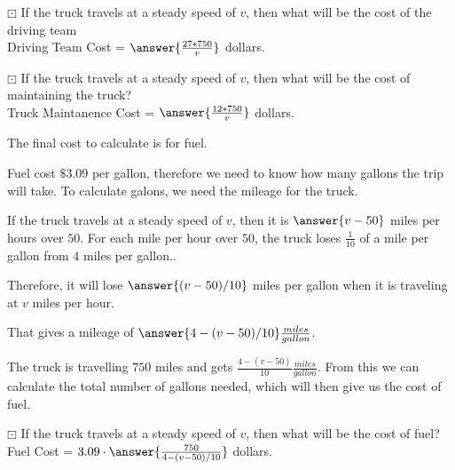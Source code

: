 \documentclass{ximera}
\begin{document}
\begin{question} $\boxdot$
If the truck travels at a steady speed of $v$, then what will be the cost of the driving team \\

Driving Team Cost = $\answer{\frac{27*750}{v}}$ dollars.
\end{question}




\begin{question} $\boxdot$
If the truck travels at a steady speed of $v$, then what will be the cost of maintaining the truck? \\

Truck Maintanence Cost = $\answer{\frac{12*750}{v}}$ dollars.
\end{question}



The final cost to calculate is for fuel.

Fuel cost $\$3.09$ per gallon, therefore we need to know how many gallons the trip will take. To calculate galons, we need the mileage for the truck.


\begin{explanation}

If the truck travels at a steady speed of $v$, then it is $\answer{v-50}$ miles per hours over $50$. For each mile per hour over $50$, the truck loses $\frac{1}{10}$ of a mile per gallon from $4$ miles per gallon..

Therefore, it will lose $\answer{(v-50)/10}$ miles per gallon when it is traveling at $v$ miles per hour.

That gives a mileage of $\answer{4-(v-50)/10} \frac{miles}{gallon}$.

\end{explanation}


The truck is travelling $750$ miles and gets $\frac{4-(v-50)}{10} \frac{miles}{gallon}$. From this we can calculate the total number of gallons needed, which will then give us the cost of fuel.






\begin{question} $\boxdot$
If the truck travels at a steady speed of $v$, then what will be the cost of fuel? \\

Fuel Cost = $ 3.09 \cdot \answer{\frac{750}{4-(v-50)/10}}$ dollars.
\end{question}
\end{document}
